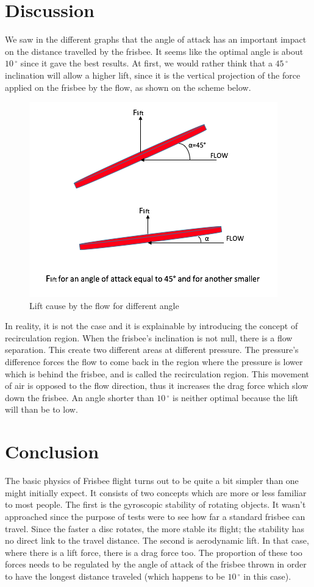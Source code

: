 \documentclass[10pt,a4paper]{report}
\begin{document}
\section{Discussion}
We saw in the different graphs that the angle of attack has an important impact on the distance travelled by the frisbee. It seems like the optimal angle is about $10\,^{\circ}$ since it gave the best results. At first, we would rather think that a $45\,^{\circ}$ inclination will allow a higher lift, since it is the vertical projection of the force applied on the frisbee by the flow, as shown on the scheme below.
\begin{figure}[!h]
\centering
\includegraphics[scale=0.6]{intuitive.jpg}
\caption{Lift cause by the flow for different angle}
\label{Lift cause by the flow for different angle}
\end{figure}
In reality, it is not the case and it is explainable by introducing the concept of recirculation region. When the frisbee's inclination is not null, there is a flow separation. This create two different areas at different pressure. The pressure's difference forces the flow to come back in the region where the pressure is lower which is behind the frisbee, and is called the recirculation region. This movement of air is opposed to the flow direction, thus it increases the drag force which slow down the frisbee. An angle shorter than $10\,^{\circ}$ is neither optimal because the lift will than be to low.
\section{Conclusion}
The basic physics of Frisbee flight turns out to be quite a bit simpler than one might initially expect. It consists of two concepts which are more or less familiar to most people. The first is the gyroscopic stability of rotating objects. It wasn't approached since the purpose of tests were to see how far a standard frisbee can travel. Since the faster a disc rotates,
the more stable its flight; the stability has no direct link to the travel distance. The second is aerodynamic lift. In that case, where there is a lift force, there is a drag force too. The proportion of these too forces needs to be regulated by the angle of attack of the frisbee thrown in order to have the longest distance traveled (which happens to be $10\,^{\circ}$ in this case).
\end{document}
